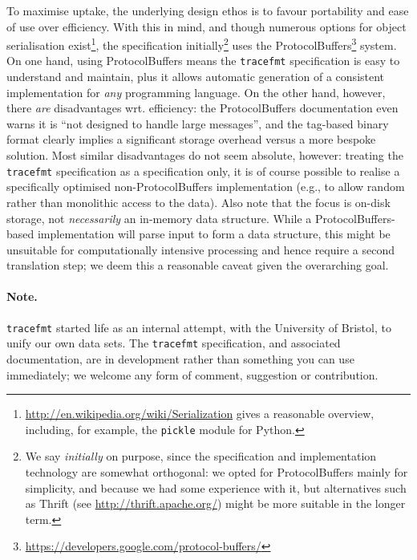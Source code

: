 \documentclass[10pt,a4paper]{llncs}
\begin{document}
To maximise uptake, the underlying design ethos is to favour portability and
ease of use over efficiency.  With this in mind, and though numerous options
for object serialisation exist\footnote{
\url{http://en.wikipedia.org/wiki/Serialization} gives a reasonable overview,
including, for example, the {\tt pickle} module for {\sf Python}.
}, the specification initially\footnote{
We say {\em initially} on purpose, since the specification and implementation
technology are somewhat orthogonal: we opted for {\sf ProtocolBuffers} mainly
for simplicity, and because we had some experience with it, but alternatives
such as {\sf Thrift} (see \url{http://thrift.apache.org/}) might be more
suitable in the longer term.
} uses the {\sf ProtocolBuffers}\footnote{
\url{https://developers.google.com/protocol-buffers/}
} system.  On one hand, using {\sf ProtocolBuffers} means the {\tt tracefmt} 
specification is easy to understand and maintain, plus it allows automatic 
generation of a consistent implementation for {\em any} programming language.  
On the other hand, however, there {\em are} disadvantages wrt. efficiency: 
the {\sf ProtocolBuffers} documentation even warns it is ``not designed to 
handle large messages'', and the tag-based binary format clearly implies a 
significant storage overhead versus a more bespoke solution.  Most similar
disadvantages do not seem absolute, however: treating the {\tt tracefmt} 
specification as a specification only, it is of course possible to realise 
a specifically optimised non-{\sf ProtocolBuffers} implementation (e.g., to 
allow random rather than monolithic access to the data).  Also note that the 
focus is on-disk storage, not {\em necessarily} an in-memory data structure.  
While a {\sf ProtocolBuffers}-based implementation will parse input to form 
a data structure, this might be unsuitable for computationally intensive 
processing and hence require a second translation step; we deem this a 
reasonable caveat given the overarching goal.

\paragraph{Note.} 
{\tt tracefmt} started life as an internal attempt, with the University of 
Bristol, to unify our own data sets.  The {\tt tracefmt} specification, and
associated documentation, are in development rather than something you can 
use immediately; we welcome any form of comment, suggestion or contribution.

\end{document}
